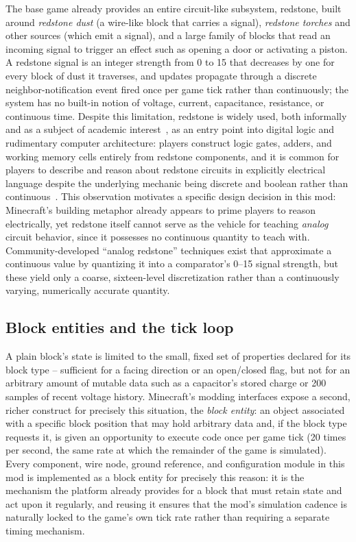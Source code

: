 The base game already provides an entire circuit-like subsystem, redstone, built around
\emph{redstone dust} (a wire-like block that carries a signal), \emph{redstone torches} and
other sources (which emit a signal), and a large family of blocks that read an incoming
signal to trigger an effect such as opening a door or activating a piston. A redstone signal
is an integer strength from 0 to 15 that decreases by one for every block of dust it
traverses, and updates propagate through a discrete neighbor-notification event fired once
per game tick rather than continuously; the system has no built-in notion of voltage,
current, capacitance, resistance, or continuous time. Despite this limitation, redstone is
widely used, both informally and as a subject of academic
interest~\cite{nebel2016mining}, as an entry point into digital logic and rudimentary
computer architecture: players construct logic gates, adders, and working memory cells
entirely from redstone components, and it is common for players to describe and reason
about redstone circuits in explicitly electrical language despite the underlying mechanic
being discrete and boolean rather than continuous~\cite{dezuanni2015redstone}. This
observation motivates a specific design decision in this mod: Minecraft's building metaphor
already appears to prime players to reason electrically, yet redstone itself cannot serve as
the vehicle for teaching \emph{analog} circuit behavior, since it possesses no continuous
quantity to teach with. Community-developed ``analog redstone'' techniques exist that
approximate a continuous value by quantizing it into a comparator's 0--15 signal strength,
but these yield only a coarse, sixteen-level discretization rather than a continuously
varying, numerically accurate quantity.

\subsection{Block entities and the tick loop}

A plain block's state is limited to the small, fixed set of properties declared for its
block type -- sufficient for a facing direction or an open/closed flag, but not for an
arbitrary amount of mutable data such as a capacitor's stored charge or 200 samples of
recent voltage history. Minecraft's modding interfaces expose a second, richer construct for
precisely this situation, the \emph{block entity}: an object associated with a specific
block position that may hold arbitrary data and, if the block type requests it, is given an
opportunity to execute code once per game tick (20 times per second, the same rate at which
the remainder of the game is simulated). Every component, wire node, ground reference, and
configuration module in this mod is implemented as a block entity for precisely this reason:
it is the mechanism the platform already provides for a block that must retain state and
act upon it regularly, and reusing it ensures that the mod's simulation cadence is
naturally locked to the game's own tick rate rather than requiring a separate timing
mechanism.

